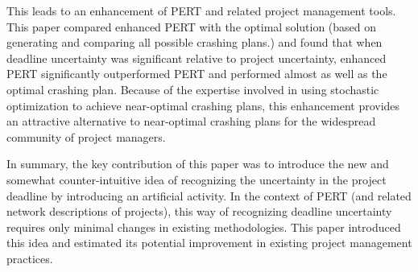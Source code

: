 \documentclass[11pt]{article}
\begin{document}
This leads to an enhancement of PERT and related project management tools.   This paper compared enhanced PERT with the optimal solution (based on generating and comparing all possible crashing plans.) and found that when deadline uncertainty was significant relative to project uncertainty, enhanced PERT significantly outperformed PERT and performed almost as well as the optimal crashing plan.   Because of the expertise involved in using stochastic optimization to achieve near-optimal crashing plans, this enhancement provides an attractive alternative to near-optimal crashing plans for the widespread community of project managers. \par
In summary, the key contribution of this paper was to introduce the new
and somewhat counter-intuitive idea of recognizing the uncertainty in the project deadline by introducing an artificial activity.  In the context of PERT (and related network descriptions of projects), this way of recognizing deadline uncertainty requires only minimal changes in existing methodologies.  This paper introduced this idea and estimated its potential improvement in existing project management practices.
\end{document}
